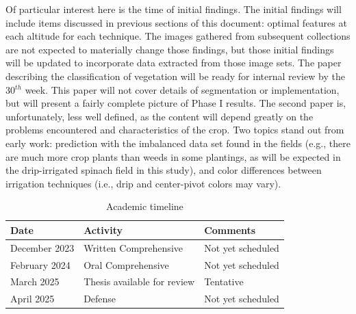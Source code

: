 \documentclass[12pt]{article}
\begin{document}
Of particular interest here is the time of initial findings. The initial findings will include items discussed in previous sections of this document: optimal features at each altitude for each technique. The images gathered from subsequent collections are not expected to materially change those findings, but those initial findings will be updated to incorporate data extracted from those image sets. The paper describing the classification of vegetation will be ready for internal review by the 30$^{th}$ week. This paper will not cover details of segmentation or implementation, but will present a fairly complete picture of Phase I results. The second paper is, unfortunately, less well defined, as the content will depend greatly on the problems encountered and characteristics of the crop. Two topics stand out from early work: prediction with the imbalanced data set found in the fields (e.g., there are much more crop plants than weeds in some plantings, as will be expected in the drip-irrigated spinach field in this study), and color differences between irrigation techniques (i.e., drip and center-pivot colors may vary).

\begin{table}[ht]
	\centering
    \caption{Academic timeline}
    \label{tab:timeline}
    \begin{tabular}[t]{lll} 
		\textbf{Date} & \textbf{Activity} &\textbf{Comments}\\
		\midrule
			December 2023 & Written Comprehensive & Not yet scheduled\\
			February 2024 & Oral Comprehensive & Not yet scheduled\\
			March 2025 & Thesis available for review & Tentative\\
			April 2025 & Defense & Not yet scheduled\\

    \end{tabular}
\end{table}

 \newpage
%
%
\end{document}
